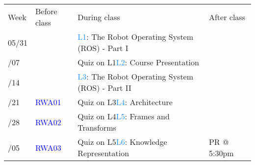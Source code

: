 \documentclass[11pt,usenames,dvipsnames,svgnames,x11names,letterpaper]{article}
\begin{document}
\newcommand{\weekI}{05/31}
\newcommand{\weekII}{06/07}
\newcommand{\weekIII}{06/14}
\newcommand{\weekIV}{06/21}
\newcommand{\weekV}{06/28}
\newcommand{\weekVI}{07/05}
\newcommand{\weekVII}{07/12}
\newcommand{\weekVIII}{07/19}
\newcommand{\weekIX}{07/26}
\newcommand{\weekX}{08/02}
\newcommand{\weekXI}{08/09}
\newcommand{\weekXII}{08/15}
\begin{center}
\begin{table}[H]
\begin{tabularx}{\textwidth}{p{1cm}p{2cm}p{9cm}p{3cm}} %
\arrayrulecolor{Gray}
\multicolumn{4}{l}{\textbf{\textcolor{myCOLOR}{\large}}} \\
\hline
\rowcolor{lightgray!30}
Week & Before class & During class & After class \\ \hline 
\weekI & & \textcolor{DodgerBlue}{L1}: The Robot Operating System (ROS) - Part I& \\
\arrayrulecolor{maingray}\hline
\weekII &  & \textcolor{OrangeRed3}{Quiz on L1}\hspace{1.5cm}\textcolor{DodgerBlue}{L2}: Course Presentation & \\
\arrayrulecolor{maingray}\hline
\weekIII &  & \textcolor{DodgerBlue}{L3}: The Robot Operating System (ROS) - Part II & \\
\arrayrulecolor{maingray}\hline
\weekIV &  \textcolor{blue}{RWA01} & \textcolor{OrangeRed3}{Quiz on L3}\hspace{1.5cm}\textcolor{DodgerBlue}{L4}: Architecture & \\
\arrayrulecolor{maingray}\hline
\weekV & \textcolor{blue}{RWA02} & \textcolor{OrangeRed3}{Quiz on L4}\hspace{1.5cm}\textcolor{DodgerBlue}{L5}:  Frames and Transforms& \\
\arrayrulecolor{maingray}\hline
\weekVI &  \textcolor{blue}{RWA03} &  \textcolor{OrangeRed3}{Quiz on L5}\hspace{1.5cm}\textcolor{DodgerBlue}{L6}: Knowledge Representation& \textcolor{Green4}{PR @ 5:30pm}\\

\end{tabularx}
\end{table}
\end{center}
\end{document}
